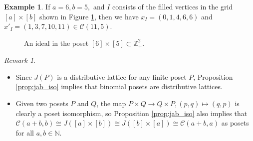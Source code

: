 \documentclass[11pt]{amsart}
\theoremstyle{plain}
\theoremstyle{definition}
\newtheorem{example}[theorem]{Example}
\theoremstyle{remark}
\newtheorem{remark}[theorem]{Remark}
\numberwithin{equation}{section}
\newcommand{\Z}{{\mathbb Z}}
\newcommand{\ra}{\rightarrow}
\newcommand{\N}{\mathbb{N}}
\newcommand{\calc}{\mathcal{C}}
\begin{document}
\begin{example}
    \label{eg:seq}
If
$a=6, b=5,$ and $I$ consists of the filled vertices in the grid $[a]\times[b]$
shown in Figure \ref{fig:seq}, then
we have $x_I=(0,1,4,6,6)$ and $x'_I=(1,3,7,10,11)\in \calc(11,5)$. 


\begin{figure}[h!]
            \centering
\caption{An ideal in the poset $[6]\times [5]\subset \Z_+^2$.}
\label{fig:seq}
\end{figure}
\end{example}

\begin{remark}
\label{rmk:symmetry}
\begin{itemize}
\item[{\rm (i)}]
Since $J(P)$ is a distributive lattice for any finite poset $P$, Proposition
\ref{prop:jab_iso} implies that binomial posets are distributive
lattices.
\item[\rm (ii)] 
Given two posets $P$ and $Q$, the map $P\times Q\ra Q\times P, (p,q)\mapsto
(q,p)$ is clearly a poset isomorphism, so Proposition \ref{prop:jab_iso} also
implies that $\calc(a+b,b)\cong J([a]\times [b])\cong J([b]\times[a]) \cong
\calc(a+b,a)$ as posets for all $a,b\in \N$. 
\end{itemize}
\end{remark}
\end{document}
